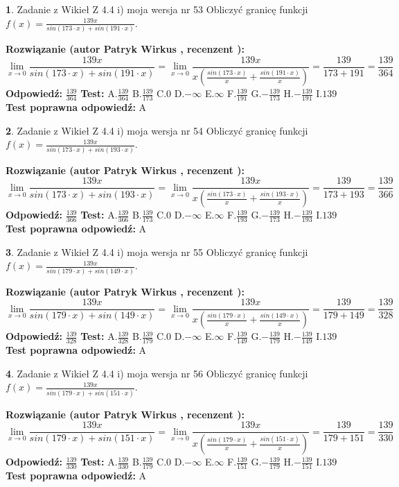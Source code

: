 \documentclass[12pt, a4paper]{article}
\theoremstyle{definition} %
\newtheorem{zad}{}
\newcommand{\zadStart}[1]{\begin{zad}#1\newline}
\newcommand{\zadStop}{\end{zad}}
\newcommand{\rozwStart}[2]{\noindent \textbf{Rozwiązanie (autor #1 , recenzent #2): }\newline}
\newcommand{\rozwStop}{\newline}
\newcommand{\odpStart}{\noindent \textbf{Odpowiedź:}\newline}
\newcommand{\odpStop}{\newline}
\newcommand{\testStart}{\noindent \textbf{Test:}\newline}
\newcommand{\testStop}{\newline}
\newcommand{\kluczStart}{\noindent \textbf{Test poprawna odpowiedź:}\newline}
\newcommand{\kluczStop}{\newline}
\begin{document}
\zadStart{Zadanie z Wikieł Z 4.4 i) moja wersja nr 53}
Obliczyć granicę funkcji $f(x)=\frac{139x}{sin(173\cdot x) +sin(191\cdot x)}$.
\zadStop
\rozwStart{Patryk Wirkus}{}
$$\lim\limits_{x\to 0}\frac{139x}{sin(173\cdot x) +sin(191\cdot x)}=\lim\limits_{x\to 0}\frac{139x}{x(\frac{sin(173\cdot x)}{x}+\frac{sin(191\cdot x)}{x})}=\frac{139}{173+191} = \frac{139}{364}$$
\rozwStop
\odpStart
$\frac{139}{364}$
\odpStop
\testStart
A.$\frac{139}{364}$
B.$\frac{139}{173}$
C.$0$
D.$-\infty$
E.$\infty$
F.$\frac{139}{191}$
G.$-\frac{139}{173}$
H.$-\frac{139}{191}$
I.$139$
\testStop
\kluczStart
A
\kluczStop



\zadStart{Zadanie z Wikieł Z 4.4 i) moja wersja nr 54}
Obliczyć granicę funkcji $f(x)=\frac{139x}{sin(173\cdot x) +sin(193\cdot x)}$.
\zadStop
\rozwStart{Patryk Wirkus}{}
$$\lim\limits_{x\to 0}\frac{139x}{sin(173\cdot x) +sin(193\cdot x)}=\lim\limits_{x\to 0}\frac{139x}{x(\frac{sin(173\cdot x)}{x}+\frac{sin(193\cdot x)}{x})}=\frac{139}{173+193} = \frac{139}{366}$$
\rozwStop
\odpStart
$\frac{139}{366}$
\odpStop
\testStart
A.$\frac{139}{366}$
B.$\frac{139}{173}$
C.$0$
D.$-\infty$
E.$\infty$
F.$\frac{139}{193}$
G.$-\frac{139}{173}$
H.$-\frac{139}{193}$
I.$139$
\testStop
\kluczStart
A
\kluczStop



\zadStart{Zadanie z Wikieł Z 4.4 i) moja wersja nr 55}
Obliczyć granicę funkcji $f(x)=\frac{139x}{sin(179\cdot x) +sin(149\cdot x)}$.
\zadStop
\rozwStart{Patryk Wirkus}{}
$$\lim\limits_{x\to 0}\frac{139x}{sin(179\cdot x) +sin(149\cdot x)}=\lim\limits_{x\to 0}\frac{139x}{x(\frac{sin(179\cdot x)}{x}+\frac{sin(149\cdot x)}{x})}=\frac{139}{179+149} = \frac{139}{328}$$
\rozwStop
\odpStart
$\frac{139}{328}$
\odpStop
\testStart
A.$\frac{139}{328}$
B.$\frac{139}{179}$
C.$0$
D.$-\infty$
E.$\infty$
F.$\frac{139}{149}$
G.$-\frac{139}{179}$
H.$-\frac{139}{149}$
I.$139$
\testStop
\kluczStart
A
\kluczStop



\zadStart{Zadanie z Wikieł Z 4.4 i) moja wersja nr 56}
Obliczyć granicę funkcji $f(x)=\frac{139x}{sin(179\cdot x) +sin(151\cdot x)}$.
\zadStop
\rozwStart{Patryk Wirkus}{}
$$\lim\limits_{x\to 0}\frac{139x}{sin(179\cdot x) +sin(151\cdot x)}=\lim\limits_{x\to 0}\frac{139x}{x(\frac{sin(179\cdot x)}{x}+\frac{sin(151\cdot x)}{x})}=\frac{139}{179+151} = \frac{139}{330}$$
\rozwStop
\odpStart
$\frac{139}{330}$
\odpStop
\testStart
A.$\frac{139}{330}$
B.$\frac{139}{179}$
C.$0$
D.$-\infty$
E.$\infty$
F.$\frac{139}{151}$
G.$-\frac{139}{179}$
H.$-\frac{139}{151}$
I.$139$
\testStop
\kluczStart
A
\kluczStop
\end{document}
